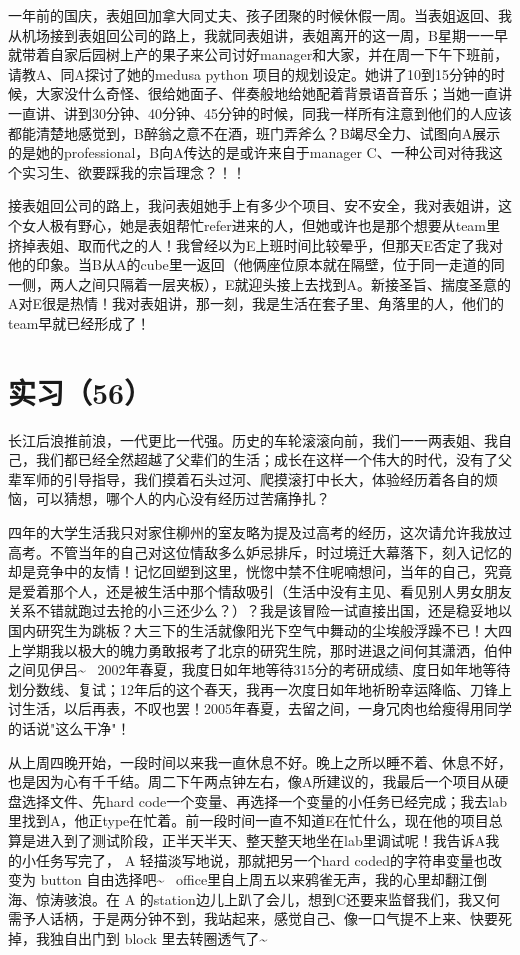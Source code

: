 \documentclass[12pt]{book}
\begin{document}
一年前的国庆，表姐回加拿大同丈夫、孩子团聚的时候休假一周。当表姐返回、我从机场接到表姐回公司的路上，我就同表姐讲，表姐离开的这一周，B星期一一早就带着自家后园树上产的果子来公司讨好manager和大家，并在周一下午下班前，请教A、同A探讨了她的medusa python 项目的规划设定。她讲了10到15分钟的时候，大家没什么奇怪、很给她面子、伴奏般地给她配着背景语音音乐；当她一直讲一直讲、讲到30分钟、40分钟、45分钟的时候，同我一样所有注意到他们的人应该都能清楚地感觉到，B醉翁之意不在酒，班门弄斧么？B竭尽全力、试图向A展示的是她的professional，B向A传达的是或许来自于manager C、一种公司对待我这个实习生、欲要踩我的宗旨理念？！！

接表姐回公司的路上，我问表姐她手上有多少个项目、安不安全，我对表姐讲，这个女人极有野心，她是表姐帮忙refer进来的人，但她或许也是那个想要从team里挤掉表姐、取而代之的人！我曾经以为E上班时间比较晕乎，但那天E否定了我对他的印象。当B从A的cube里一返回（他俩座位原本就在隔壁，位于同一走道的同一侧，两人之间只隔着一层夹板），E就迎头接上去找到A。新接圣旨、揣度圣意的A对E很是热情！我对表姐讲，那一刻，我是生活在套子里、角落里的人，他们的team早就已经形成了！


\section{实习（56）}
\label{sec-5-59}

长江后浪推前浪，一代更比一代强。历史的车轮滚滚向前，我们一一两表姐、我自己，我们都已经全然超越了父辈们的生活；成长在这样一个伟大的时代，没有了父辈军师的引导指导，我们摸着石头过河、爬摸滚打中长大，体验经历着各自的烦恼，可以猜想，哪个人的内心没有经历过苦痛挣扎？

四年的大学生活我只对家住柳州的室友略为提及过高考的经历，这次请允许我放过高考。不管当年的自己对这位情敌多么妒忌排斥，时过境迁大幕落下，刻入记忆的却是竞争中的友情！记忆回塑到这里，恍惚中禁不住呢喃想问，当年的自己，究竟是爱着那个人，还是被生活中那个情敌吸引（生活中没有主见、看见别人男女朋友关系不错就跑过去抢的小三还少么？）？我是该冒险一试直接出国，还是稳妥地以国内研究生为跳板？大三下的生活就像阳光下空气中舞动的尘埃般浮躁不已！大四上学期我以极大的魄力勇敢报考了北京的研究生院，那时进退之间何其潇洒，伯仲之间见伊吕\textasciitilde{}~ 2002年春夏，我度日如年地等待315分的考研成绩、度日如年地等待划分数线、复试；12年后的这个春天，我再一次度日如年地祈盼幸运降临、刀锋上讨生活，以后再表，不叹也罢！2005年春夏，去留之间，一身冗肉也给瘦得用同学的话说"这么干净"！

从上周四晚开始，一段时间以来我一直休息不好。晚上之所以睡不着、休息不好，也是因为心有千千结。周二下午两点钟左右，像A所建议的，我最后一个项目从硬盘选择文件、先hard code一个变量、再选择一个变量的小任务已经完成；我去lab里找到A，他正type在忙着。前一段时间一直不知道E在忙什么，现在他的项目总算是进入到了测试阶段，正半天半天、整天整天地坐在lab里调试呢！我告诉A我的小任务写完了， A 轻描淡写地说，那就把另一个hard coded的字符串变量也改变为 button 自由选择吧\textasciitilde{}~ office里自上周五以来鸦雀无声，我的心里却翻江倒海、惊涛骇浪。在 A 的station边儿上趴了会儿，想到C还要来监督我们，我又何需予人话柄，于是两分钟不到，我站起来，感觉自己、像一口气提不上来、快要死掉，我独自出门到 block 里去转圈透气了\textasciitilde{}~
\end{document}
